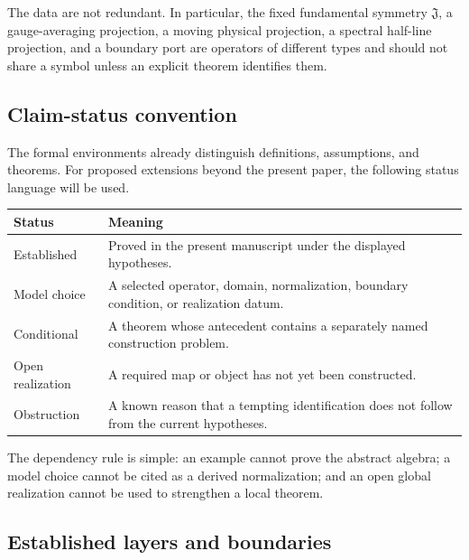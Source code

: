 \documentclass[11pt,reqno]{scrartcl}
\newcommand{\fundJ}{\mathfrak J}
\theoremstyle{plain}
\theoremstyle{definition}
\theoremstyle{remark}
\begin{document}
The data are not redundant.  In particular, the fixed fundamental symmetry
\(\fundJ\), a gauge-averaging projection, a moving physical projection, a
spectral half-line projection, and a boundary port are operators of different
types and should not share a symbol unless an explicit theorem identifies
them.

\subsection{Claim-status convention}

The formal environments already distinguish definitions, assumptions, and
theorems.  For proposed extensions beyond the present paper, the following
status language will be used.

\begin{center}
\small
\begin{tabularx}{\textwidth}{>{\raggedright\arraybackslash}p{} X}
\toprule
\textbf{Status} & \textbf{Meaning} \\
\midrule
Established & Proved in the present manuscript under the displayed hypotheses. \\
Model choice & A selected operator, domain, normalization, boundary condition, or realization datum. \\
Conditional & A theorem whose antecedent contains a separately named construction problem. \\
Open realization & A required map or object has not yet been constructed. \\
Obstruction & A known reason that a tempting identification does not follow from the current hypotheses. \\
\bottomrule
\end{tabularx}
\end{center}

The dependency rule is simple: an example cannot prove the abstract algebra;
a model choice cannot be cited as a derived normalization; and an open global
realization cannot be used to strengthen a local theorem.

\subsection{Established layers and boundaries}
\end{document}
